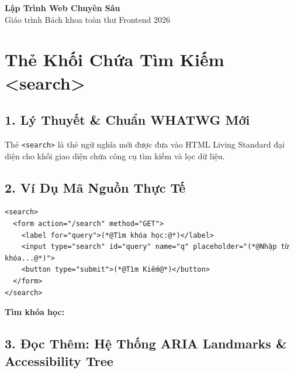 \documentclass[11pt,oneside]{book}
\newcommand{\codeinline}[1]{\textcolor{accentOrange}{\texttt{#1}}}
\begin{document}
\begin{browserWindow}
\sffamily
{\Huge\bfseries Lập Trình Web Chuyên Sâu}\\[2pt]
{\color{gray!80}\Large Giáo trình Bách khoa toàn thư Frontend 2026}
\end{browserWindow}

\section{Thẻ Khối Chứa Tìm Kiếm <search>}
\subsection{1. Lý Thuyết \& Chuẩn WHATWG Mới}
Thẻ \codeinline{<search>} là thẻ ngữ nghĩa mới được đưa vào HTML Living Standard đại diện cho khối giao diện chứa công cụ tìm kiếm và lọc dữ liệu.

\subsection{2. Ví Dụ Mã Nguồn Thực Tế}
\begin{codeWindow}
\begin{lstlisting}[language=HTML5]
<search>
  <form action="/search" method="GET">
    <label for="query">(*@Tìm khóa học:@*)</label>
    <input type="search" id="query" name="q" placeholder="(*@Nhập từ khóa...@*)">
    <button type="submit">(*@Tìm Kiếm@*)</button>
  </form>
</search>
\end{lstlisting}
\end{codeWindow}

\begin{browserWindow}
\sffamily\small
\textbf{Tìm khóa học:} \;\;
 \;\;
\end{browserWindow}

\subsection{3. Đọc Thêm: Hệ Thống ARIA Landmarks \& Accessibility Tree}
\end{document}
